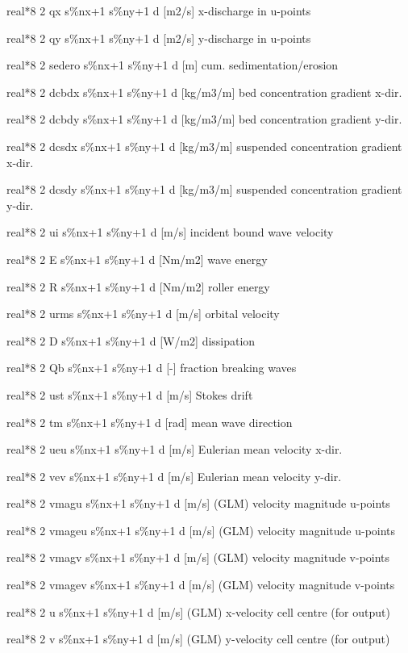 real*8  2  qx     s\%nx+1 s\%ny+1 d  [m2/s]     x-discharge in u-points

real*8  2  qy     s\%nx+1 s\%ny+1 d  [m2/s]     y-discharge in u-points

real*8  2  sedero s\%nx+1 s\%ny+1 d  [m]        cum. sedimentation/erosion

real*8  2  dcbdx   s\%nx+1 s\%ny+1 d  [kg/m3/m]  bed concentration gradient x-dir.

real*8  2  dcbdy   s\%nx+1 s\%ny+1 d  [kg/m3/m]  bed concentration gradient y-dir.

real*8  2  dcsdx   s\%nx+1 s\%ny+1 d  [kg/m3/m]  suspended concentration gradient x-dir.

real*8  2  dcsdy   s\%nx+1 s\%ny+1 d  [kg/m3/m]  suspended concentration gradient y-dir.

real*8  2  ui     s\%nx+1 s\%ny+1 d  [m/s]      incident bound wave velocity

real*8  2  E      s\%nx+1 s\%ny+1 d  [Nm/m2]    wave energy

real*8  2  R      s\%nx+1 s\%ny+1 d  [Nm/m2]    roller energy

real*8  2  urms   s\%nx+1 s\%ny+1 d  [m/s]      orbital velocity

real*8  2  D      s\%nx+1 s\%ny+1 d  [W/m2]     dissipation

real*8  2  Qb     s\%nx+1 s\%ny+1 d  [-]        fraction breaking waves

real*8  2  ust    s\%nx+1 s\%ny+1 d  [m/s]      Stokes drift

real*8  2  tm     s\%nx+1 s\%ny+1 d  [rad]      mean wave direction

real*8  2  ueu    s\%nx+1 s\%ny+1 d  [m/s]      Eulerian mean velocity x-dir.

real*8  2  vev    s\%nx+1 s\%ny+1 d  [m/s]      Eulerian mean velocity y-dir.

real*8  2  vmagu  s\%nx+1 s\%ny+1 d  [m/s]      (GLM) velocity magnitude u-points

real*8  2  vmageu s\%nx+1 s\%ny+1 d  [m/s]      (GLM) velocity magnitude u-points

real*8  2  vmagv  s\%nx+1 s\%ny+1 d  [m/s]      (GLM) velocity magnitude v-points

real*8  2  vmagev s\%nx+1 s\%ny+1 d  [m/s]      (GLM) velocity magnitude v-points

real*8  2  u      s\%nx+1 s\%ny+1 d  [m/s]      (GLM) x-velocity cell centre (for output)

real*8  2  v      s\%nx+1 s\%ny+1 d  [m/s]      (GLM) y-velocity cell centre (for output)

